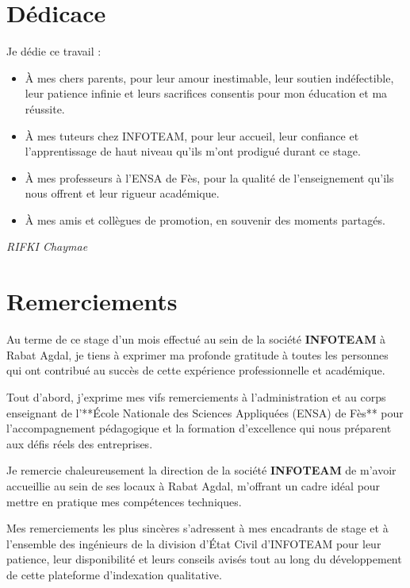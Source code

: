 \documentclass[12pt,a4paper,oneside]{report}
\begin{document}

\chapter*{Dédicace}
Je dédie ce travail :
\begin{itemize}
    \item À mes chers parents, pour leur amour inestimable, leur soutien indéfectible, leur patience infinie et leurs sacrifices consentis pour mon éducation et ma réussite.
    \item À mes tuteurs chez INFOTEAM, pour leur accueil, leur confiance et l'apprentissage de haut niveau qu'ils m'ont prodigué durant ce stage.
    \item À mes professeurs à l'ENSA de Fès, pour la qualité de l'enseignement qu'ils nous offrent et leur rigueur académique.
    \item À mes amis et collègues de promotion, en souvenir des moments partagés.
\end{itemize}
\begin{flushright}
    \textit{RIFKI Chaymae}
\end{flushright}

\chapter*{Remerciements}
Au terme de ce stage d'un mois effectué au sein de la société \textbf{INFOTEAM} à Rabat Agdal, je tiens à exprimer ma profonde gratitude à toutes les personnes qui ont contribué au succès de cette expérience professionnelle et académique.

Tout d'abord, j'exprime mes vifs remerciements à l'administration et au corps enseignant de l'**École Nationale des Sciences Appliquées (ENSA) de Fès** pour l'accompagnement pédagogique et la formation d'excellence qui nous préparent aux défis réels des entreprises.

Je remercie chaleureusement la direction de la société \textbf{INFOTEAM} de m'avoir accueillie au sein de ses locaux à Rabat Agdal, m'offrant un cadre idéal pour mettre en pratique mes compétences techniques. 

Mes remerciements les plus sincères s'adressent à mes encadrants de stage et à l'ensemble des ingénieurs de la division d'État Civil d'INFOTEAM pour leur patience, leur disponibilité et leurs conseils avisés tout au long du développement de cette plateforme d'indexation qualitative.
\end{document}
